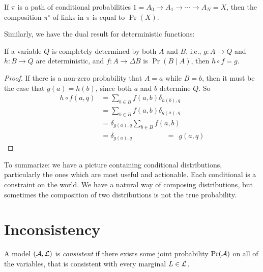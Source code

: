 \documentclass{article}
\begin{document}
	\begin{prop}\label{prop:prob-eq}
		If $\pi$ is a path of conditional probabilities $1 = A_0 \to A_1\to\cdots \to A_N = X$, then the composition $\pi^\circ$ of links in $\pi$ is equal to $\Pr(X)$.
	\end{prop}

	Similarly, we have the dual result for deterministic functions:
	\begin{prop}\label{prop:det-eq}
		If a variable $Q$ is completely determined by both $A$ and $B$, i.e., $g : A\to Q$ and $h : B\to Q$ are deterministic, and $f : A \to \Delta B$ is $\Pr(B \mid A)$, then $h \circ f = g$. 
	\end{prop}
	\begin{proof}
		If there is a non-zero probability that $A = a$ while $B = b$, then it must be the case that $g(a) = h(b)$, since both $a$ and $b$ determine $Q$. So
		\begin{align*}
			h \circ f(a,q) &= \sum_{b \in B} f(a,b) \delta_{h(b),q}\\	
					&= \sum_{b \in B} f(a,b) \delta_{g(a), q} \\
					&= \delta_{g(a),q} \sum_{b \in B} f(a,b) \\
					&= \delta_{g(a),q} 
					\hspace{2cm}=~~g(a, q)
		\end{align*}
	\end{proof}

	To summarize: we have a picture containing conditional distributions, particularly the ones which are most useful and actionable. Each conditional is a constraint on the world. We have a natural way of composing distributions, but sometimes the composition of two distributions is not the true probability.
	
	\section{Inconsistency}
	
	\begin{defn}[consistency]
		A model $(\cal A, L)$ is \emph{consistent} if there exists some joint probability $\Pr(\cal A)$ on all of the variables, that is consistent with every marginal $L \in \cal L$.
	\end{defn}
\end{document}
